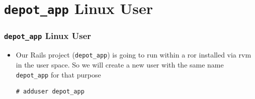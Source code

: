 \documentclass{beamer}
\begin{document}
\section{\texttt{depot\_app} Linux User }
\begin{frame}[fragile]
\frametitle{\texttt{depot\_app} Linux User}
\begin{itemize}

\item Our Rails project (\texttt{depot\_app}) is going to run within a \acrshort{ror} installed via \acrshort{rvm} in the user space. So we will create a new  user with the same name \texttt{depot\_app} for that purpose

\lstset{language=shell, escapechar=!}
\begin{lstlisting}[escapechar=!]
# adduser depot_app
\end{lstlisting}
\end{itemize}
\end{frame}


\end{document}
